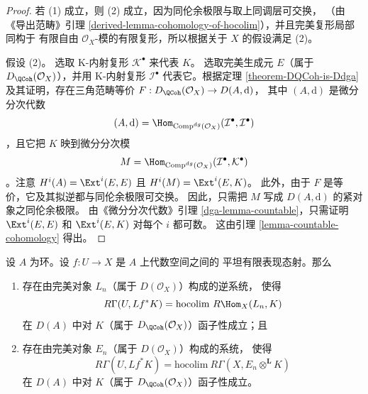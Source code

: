 \begin{proof}
若 (1) 成立，则 (2) 成立，因为同伦余极限与取上同调层可交换，%
（由《导出范畴》引理
\ref{derived-lemma-cohomology-of-hocolim}），并且完美复形局部同构于
有限自由 $\mathcal{O}_X$-模的有限复形，所以根据关于 $X$ 的假设满足 (2)。

\medskip\noindent
假设 (2)。
选取 K-内射复形 $\mathcal{K}^\bullet$ 来代表 $K$。
选取完美生成元 $E$（属于 $D_\QCoh(\mathcal{O}_X)$），并用 K-内射复形
$\mathcal{I}^\bullet$ 代表它。根据定理
\ref{theorem-DQCoh-is-Ddga} 及其证明，存在三角范畴等价
$F : D_\QCoh(\mathcal{O}_X) \to D(A, \text{d})$，
其中 $(A, \text{d})$ 是微分分次代数
$$
(A, \text{d}) =
\Hom_{\text{Comp}^{dg}(\mathcal{O}_X)}
(\mathcal{I}^\bullet, \mathcal{I}^\bullet)
$$
，且它把 $K$ 映到微分分次模
$$
M = \Hom_{\text{Comp}^{dg}(\mathcal{O}_X)}
(\mathcal{I}^\bullet, \mathcal{K}^\bullet)
$$
。注意 $H^i(A) = \Ext^i(E, E)$ 且
$H^i(M) = \Ext^i(E, K)$。
此外，由于 $F$ 是等价，它及其拟逆都与同伦余极限可交换。
因此，只需把 $M$ 写成 $D(A, \text{d})$ 的紧对象之同伦余极限。
由《微分分次代数》引理 \ref{dga-lemma-countable}，只需证明 %
$\Ext^i(E, E)$ 和 $\Ext^i(E, K)$ 对每个 $i$ 都可数。
这由引理 \ref{lemma-countable-cohomology} 得出。
\end{proof}

\begin{lemma}
\label{lemma-computing-sections-as-colim}
设 $A$ 为环。设 $f : U \to X$ 是 $A$ 上代数空间之间的
平坦有限表现态射。那么
\begin{enumerate}
\item 存在由完美对象 $L_n$（属于 $D(\mathcal{O}_X)$）构成的逆系统，
使得
$$
R\Gamma(U, Lf^*K) = \text{hocolim}\ R\Hom_X(L_n, K)
$$
在 $D(A)$ 中对 $K$（属于 $D_\QCoh(\mathcal{O}_X)$）函子性成立；且
\item 存在由完美对象 $E_n$（属于 $D(\mathcal{O}_X)$）构成的系统，
使得
$$
R\Gamma(U, Lf^*K) = \text{hocolim}\ R\Gamma(X, E_n \otimes^\mathbf{L} K)
$$
在 $D(A)$ 中对 $K$（属于 $D_\QCoh(\mathcal{O}_X)$）函子性成立。
\end{enumerate}
\end{lemma}

